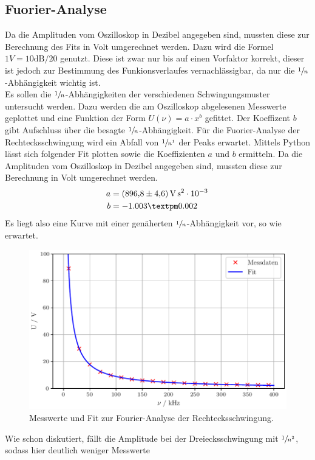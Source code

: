 \subsection{Fuorier-Analyse}
Da die Amplituden vom Oszilloskop in Dezibel angegeben sind, mussten diese zur Berechnung des Fits in Volt umgerechnet werden.
Dazu wird die Formel $1V=10{\text{dB}/20}$ genutzt. Diese ist zwar nur bis auf einen Vorfaktor korrekt, dieser ist jedoch zur Bestimmung
des Funkionsverlaufes vernachlässigbar, da nur die $\sfrac{1}{n}$-Abhängigkeit wichtig ist.\\
Es sollen die $\sfrac{1}{n}$-Abhängigkeiten der verschiedenen Schwingungsmuster untersucht werden. Dazu werden die am Oszilloskop 
abgelesenen Messwerte geplottet und eine Funktion der Form $U(\nu)=a\cdot x^b$ gefittet. Der Koeffizent $b$ gibt Aufschluss über die 
besagte $\sfrac{1}{n}$-Abhängigkeit. Für die Fuorier-Analyse der Rechtecksschwingung wird ein Abfall von $\sfrac{1}{n^1}$ der Peaks
erwartet.
Mittels Python lässt sich folgender Fit plotten sowie die Koeffizienten $a$ und $b$ ermitteln.
Da die Amplituden vom Oszilloskop in Dezibel angegeben sind, mussten diese zur Berechnung in Volt umgerechnet werden.
\begin{align*}
  a &= \SI{896.8 +- 4.6}{\volt\second\squared}\cdot10^{-3}\, \\
  b &= -1.003 ± 0.002
\end{align*}
Es liegt also eine Kurve mit einer genäherten $\sfrac{1}{n}$-Abhängigkeit vor, so wie erwartet.
\begin{figure}[H]
  \centering
  \includegraphics[scale=0.6]{plota.pdf}
  \caption{Messwerte und Fit zur Fourier-Analyse der Rechtecksschwingung.}
  \label{fig:Plot1}
\end{figure}\noindent
Wie schon diskutiert, fällt die Amplitude bei der Dreiecksschwingung mit $\sfrac{1}{n^2}$, sodass hier deutlich weniger Messwerte
